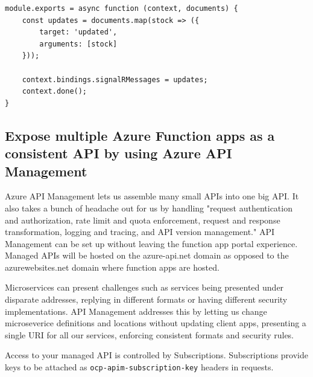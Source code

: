 \documentclass{article}
\newcommand{\code}{\texttt}
\begin{document}
\begin{lstlisting}
module.exports = async function (context, documents) {
    const updates = documents.map(stock => ({
        target: 'updated',
        arguments: [stock]
    }));

    context.bindings.signalRMessages = updates;
    context.done();
}
\end{lstlisting}

\subsection{Expose multiple Azure Function apps as a consistent API by using Azure API Management}
Azure API Management lets us assemble many small APIs into one big API. It also takes a bunch of headache out for us by handling "request authentication and authorization, rate limit and quota enforcement, request and response transformation, logging and tracing, and API version management." API Management can be set up without leaving the function app portal experience. Managed APIs will be hosted on the azure-api.net domain as opposed to the azurewebsites.net domain where function apps are hosted.

Microservices can present challenges such as services being presented under disparate addresses, replying in different formats or having different security implementations. API Management addresses this by letting us change microseverice definitions and locations without updating client apps, presenting a single URI for all our services, enforcing consistent formats and security rules.

Access to your managed API is controlled by Subscriptions. Subscriptions provide keys to be attached as \code{ocp-apim-subscription-key} headers in requests.
\end{document}
